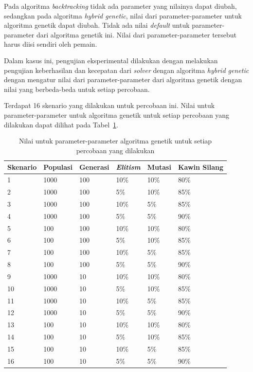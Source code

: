 Pada algoritma \textit{backtracking} tidak ada parameter yang nilainya dapat diubah, sedangkan pada algoritma \textit{hybrid genetic}, nilai dari parameter-parameter untuk algoritma genetik dapat diubah. Tidak ada nilai \textit{default} untuk parameter-parameter dari algoritma genetik ini. Nilai dari parameter-parameter tersebut harus diisi sendiri oleh pemain.

Dalam kasus ini, pengujian eksperimental dilakukan dengan melakukan pengujian keberhasilan dan kecepatan dari \textit{solver} dengan algoritma \textit{hybrid genetic} dengan mengatur nilai dari parameter-parameter dari algoritma genetik dengan nilai yang berbeda-beda untuk setiap percobaan.

Terdapat 16 skenario yang dilakukan untuk percobaan ini. Nilai untuk parameter-parameter untuk algoritma genetik untuk setiap percobaan yang dilakukan dapat dilihat pada Tabel~\ref{tab:nilaiparameterhg}.

\begin{table}
\centering
\captionsetup{justification=centering}
\caption[Nilai untuk parameter-parameter algoritma genetik untuk setiap percobaan yang dilakukan]{Nilai untuk parameter-parameter algoritma genetik untuk setiap percobaan yang dilakukan}
\begin{tabular}{| l | l | l | l | l | l |}
\hline
Skenario & Populasi & Generasi & \textit{Elitism} & Mutasi & Kawin Silang  \\
\hline \hline
1 & 1000 & 100 & 10\% & 10\% & 80\% \\
\hline
2 & 1000 & 100 & 5\% & 10\% & 85\% \\
\hline
3 & 1000 & 100 & 10\% & 5\% & 85\% \\
\hline
4 & 1000 & 100  & 5\% & 5\% & 90\% \\
\hline
5 & 100 & 100 & 10\% & 10\% & 80\% \\
\hline
6 & 100 & 100 & 5\% & 10\% & 85\% \\
\hline
7 & 100 & 100 & 10\% & 5\% & 85\% \\
\hline
8 & 100 & 100 & 5\% & 5\% & 90\% \\
\hline
9 & 1000 & 10 & 10\% & 10\% & 80\% \\
\hline
10 & 1000 & 10 & 5\% & 10\% & 85\% \\
\hline
11 & 1000 & 10 & 10\% & 5\% & 85\% \\
\hline
12 & 1000 & 10  & 5\% & 5\% & 90\% \\
\hline
13 & 100 & 10 & 10\% & 10\% & 80\% \\
\hline
14 & 100 & 10 & 5\% & 10\% & 85\% \\
\hline
15 & 100 & 10 & 10\% & 5\% & 85\% \\
\hline
16 & 100 & 10 & 5\% & 5\% & 90\% \\
\hline
\end{tabular}
\label{tab:nilaiparameterhg}
\end{table}


